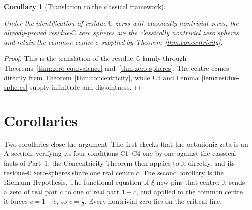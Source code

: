 \documentclass[11pt]{article}
\newcommand{\CC}{\mathbb{C}}
\providecommand{\lean}[1]{}
\providecommand{\uses}[1]{}
\theoremstyle{plain}
\newtheorem{corollary}[theorem]{Corollary}
\theoremstyle{definition}
\theoremstyle{remark}
\begin{document}
\begin{corollary}[Translation to the classical framework]\label{cor:nontrivial}
\lean{ASection.nontrivial_one_centre}
\uses{thm:concentricity, thm:zero-equivalence, thm:zero-spheres, lem:residue-spheres}
Under the identification of residue-$\CC$ zeros with classically nontrivial zeros, the already-proved
residue-$\CC$ zero spheres are the classically nontrivial zero spheres and retain the
common centre $c$ supplied by Theorem~\ref{thm:concentricity}.
\end{corollary}
\begin{proof}
This is the translation of the residue-$\CC$ family through
Theorems~\ref{thm:zero-equivalence} and~\ref{thm:zero-spheres}. The centre comes directly from
Theorem~\ref{thm:concentricity}, while \textup{C4} and Lemma~\ref{lem:residue-spheres} supply
infinitude and disjointness.
\end{proof}


\section{Corollaries}\label{sec:verification}

Two corollaries close the argument. The first checks that the octonionic zeta is an A-section,
verifying its four conditions C1--C4 one by one against the classical facts of Part~1; the
Concentricity Theorem then applies to it directly, and its residue-$\CC$ zero-spheres share one real
centre $c$. The second corollary is the Riemann Hypothesis. The functional equation of $\xi$ now
pins that centre: it sends a zero of real part $c$ to one of real part $1-c$, and applied to the
common centre it forces $c=1-c$, so $c=\tfrac12$. Every nontrivial zero lies on the critical line.
\end{document}
